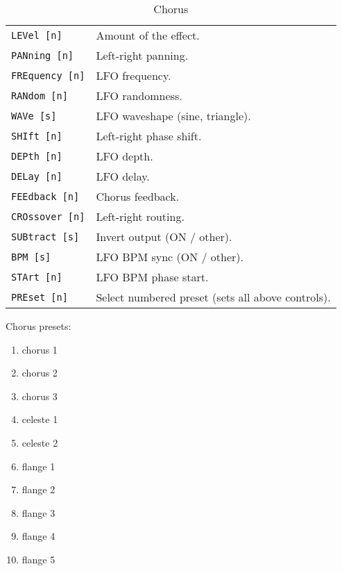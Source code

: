    \begin{table}[H]
      \centering
      \caption{Chorus}
      \begin{tabular}{l l}
\texttt{LEVel [n]} &
   Amount of the effect. \\
\texttt{PANning [n]} &
   Left-right panning. \\
\texttt{FREquency [n]} &
   LFO frequency. \\
\texttt{RANdom [n]} &
   LFO randomness. \\
\texttt{WAVe [s]} &
   LFO waveshape (sine, triangle). \\
\texttt{SHIft [n]} &
   Left-right phase shift. \\
\texttt{DEPth [n]} &
   LFO depth. \\
\texttt{DELay [n]} &
   LFO delay. \\
\texttt{FEEdback [n]} &
   Chorus feedback. \\
\texttt{CROssover [n]} &
   Left-right routing. \\
\texttt{SUBtract [s]} &
   Invert output (ON / other). \\
\texttt{BPM [s]} &
   LFO BPM sync (ON / other). \\
\texttt{STArt [n]} &
   LFO BPM phase start. \\
\texttt{PREset [n]} &
   Select numbered preset (sets all above controls). \\
      \end{tabular}
   \end{table}
Chorus presets:
   \begin{enumerate}
      \item chorus 1
      \item chorus 2
      \item chorus 3
      \item celeste 1
      \item celeste 2
      \item flange 1
      \item flange 2
      \item flange 3
      \item flange 4
      \item flange 5
   \end{enumerate}

